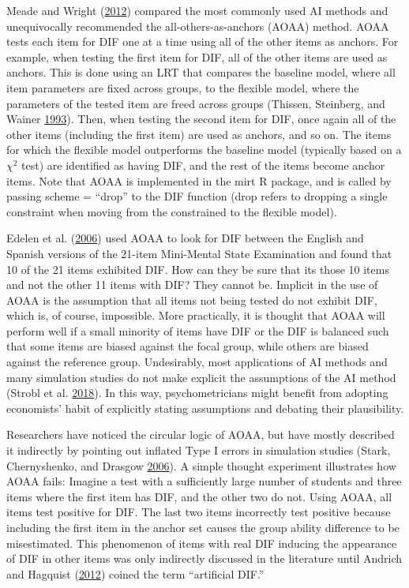 \documentclass[
  11pt,
]{article}
\begin{document}
Meade and Wright (\protect\hyperlink{ref-meade2012solving}{2012}) compared the most commonly used AI methods and unequivocally recommended the all-others-as-anchors (AOAA) method. AOAA tests each item for DIF one at a time using all of the other items as anchors. For example, when testing the first item for DIF, all of the other items are used as anchors. This is done using an LRT that compares the baseline model, where all item parameters are fixed across groups, to the flexible model, where the parameters of the tested item are freed across groups (Thissen, Steinberg, and Wainer \protect\hyperlink{ref-thissen1993detection}{1993}). Then, when testing the second item for DIF, once again all of the other items (including the first item) are used as anchors, and so on. The items for which the flexible model outperforms the baseline model (typically based on a \(\chi^2\) test) are identified as having DIF, and the rest of the items become anchor items. Note that AOAA is implemented in the mirt R package, and is called by passing scheme = \enquote{drop} to the DIF function (drop refers to dropping a single constraint when moving from the constrained to the flexible model).

Edelen et al. (\protect\hyperlink{ref-edelen2006identification}{2006}) used AOAA to look for DIF between the English and Spanish versions of the 21-item Mini-Mental State Examination and found that 10 of the 21 items exhibited DIF. How can they be sure that its those 10 items and not the other 11 items with DIF? They cannot be. Implicit in the use of AOAA is the assumption that all items not being tested do not exhibit DIF, which is, of course, impossible. More practically, it is thought that AOAA will perform well if a small minority of items have DIF or the DIF is balanced such that some items are biased against the focal group, while others are biased against the reference group. Undesirably, most applications of AI methods and many simulation studies do not make explicit the assumptions of the AI method (Strobl et al. \protect\hyperlink{ref-strobl2018anchor}{2018}). In this way, psychometricians might benefit from adopting economists' habit of explicitly stating assumptions and debating their plausibility.

Researchers have noticed the circular logic of AOAA, but have mostly described it indirectly by pointing out inflated Type I errors in simulation studies (Stark, Chernyshenko, and Drasgow \protect\hyperlink{ref-stark2006detecting}{2006}). A simple thought experiment illustrates how AOAA fails: Imagine a test with a sufficiently large number of students and three items where the first item has DIF, and the other two do not. Using AOAA, all items test positive for DIF. The last two items incorrectly test positive because including the first item in the anchor set causes the group ability difference to be misestimated. This phenomenon of items with real DIF inducing the appearance of DIF in other items was only indirectly discussed in the literature until Andrich and Hagquist (\protect\hyperlink{ref-andrich2012real}{2012}) coined the term \enquote{artificial DIF.}
\end{document}
